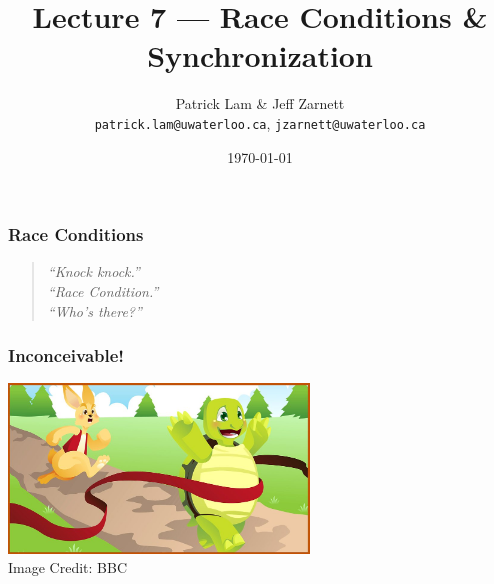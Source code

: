 
\usepackage{multirow}

\title{Lecture 7 --- Race Conditions \& Synchronization }

\author{Patrick Lam \& Jeff Zarnett \\ \small \texttt{patrick.lam@uwaterloo.ca}, \texttt{jzarnett@uwaterloo.ca}}
\date{\today}




\begin{frame}
  \titlepage

 \end{frame}



\begin{frame}
\frametitle{Race Conditions }

\vfill
\begin{quote}
\textit{
	``Knock knock.''\\
	``Race Condition.''\\
	``Who's there?''
	}
\end{quote}
\end{frame}


\begin{frame}
\frametitle{Inconceivable!}

\begin{center}
	\includegraphics[width=0.6\textwidth]{images/tortoise-hare.jpg}\\
	\hfill Image Credit: BBC
\end{center}


\end{frame}




